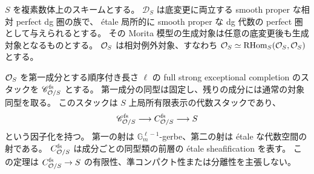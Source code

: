 \begin{theorem}
\label{thm:full-strong-completion-etale}
$S$ を複素数体上のスキームとする。
$\mathcal D_S$ は底変更に両立する smooth proper な相対 perfect dg 圏の族で、
\'etale 局所的に smooth proper な dg 代数の perfect 圏として与えられるとする。
その Morita 模型の生成対象は任意の底変更後も生成対象となるものとする。
$\mathcal O_S$ は相対例外対象、すなわち
$\mathcal O_S\simeq\operatorname{RHom}_S(\mathcal O_S,\mathcal O_S)$ とする。

$\mathcal O_S$ を第一成分とする順序付き長さ $\ell$ の
full strong exceptional completion のスタックを
$\mathscr C^{\rm fs}_{\mathcal O/S}$ とする。
第一成分の同型は固定し、残りの成分には通常の対象同型を取る。
このスタックは $S$ 上局所有限表示の代数スタックであり、
\begin{equation}\label{eq:strong-completion-gerbe-etale}
 \mathscr C^{\rm fs}_{\mathcal O/S}\longrightarrow
 C^{\rm fs}_{\mathcal O/S}\longrightarrow S
\end{equation}
という因子化を持つ。
第一の射は $\mathbb G_m^{\ell-1}$-gerbe、第二の射は \'etale な代数空間の射である。
$C^{\rm fs}_{\mathcal O/S}$ は成分ごとの同型類の前層の \'etale sheafification を表す。
この定理は $C^{\rm fs}_{\mathcal O/S}\to S$ の有限性、準コンパクト性または分離性を主張しない。
\end{theorem}

